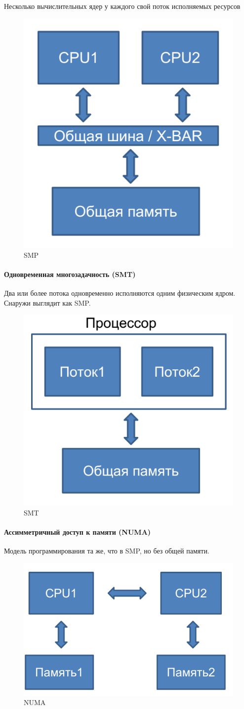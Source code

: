 \documentclass[10pt,a4paper,oneside,titlepage]{article}
\begin{document}
Несколько вычислительных ядер у каждого свой поток исполняемых ресурсов

\begin{figure}[h]
	\centering
	\includegraphics*[width=0.4\linewidth]{pictures/SMP}
	\caption{SMP}
	\label{fig:smp}
\end{figure}



\paragraph{Одновременная многозадачность (SMT)}

Два или более потока одновременно исполняются одним физическим ядром. Снаружи выглядит как SMP.

\begin{figure}[h]
	\centering
	\includegraphics*[width=0.4\linewidth]{pictures/SMT}
	\caption{SMT}
	\label{fig:smt}
\end{figure}



\paragraph{Ассимметричный доступ к памяти (NUMA)}

Модель программирования та же, что в SMP, но без общей памяти.

\begin{figure}[h]
	\centering
	\includegraphics*[width=0.4\linewidth]{pictures/NUMA}
	\caption{NUMA}
	\label{fig:numa}
\end{figure}
\end{document}
